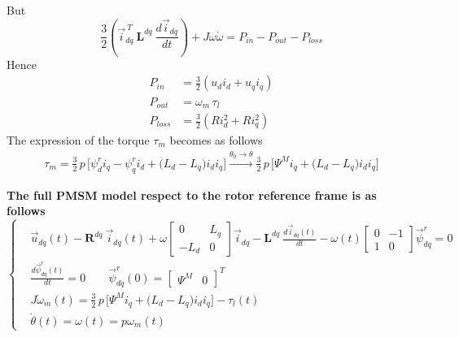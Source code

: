 \documentclass[11pt,a4paper,oneside]{book}
\numberwithin{equation}{section}
\theoremstyle{it}
\theoremstyle{definition}
\begin{document}
But 
\begin{equation*}
	\frac{3}{2} \left( \vec{i}_{dq}^{\ T}\ \mathbf{L}^{dq}\ 
	\frac{d\vec{i}_{dq}}{dt}\right) + J\omega\dot{\omega}= 
	P_{in}-P_{out}-P_{loss}
\end{equation*}
Hence
\begin{equation*}
	\begin{aligned}
		P_{in} &= \frac{3}{2}\left( u_d i_d+u_q i_q\right)  \\[6pt]
		P_{out} &= \omega_m\,\tau_l \\[6pt]
		P_{loss} &= \frac{3}{2}\left( Ri_d^2+Ri_q^2\right) 
	\end{aligned} 
\end{equation*}
The expression of the torque $\tau_m$ becomes as follows
\begin{equation}
	\begin{aligned}
		\tau_m = \frac{3}{2}\,p\,\Big[\psi^r_{d}i_{q}-\psi^r_{q}i_{d} + 
		\big(L_d-L_q\big)i_di_q\Big] 
		\xrightarrow{\theta_0\rightarrow\theta} 
		\frac{3}{2}\,p\,\Big[\Psi^Mi_{q}
		+ \big(L_d-L_q\big)i_di_q\Big]
	\end{aligned} 
\end{equation}

\begin{mybox}
	\textbf{The full PMSM model respect to the rotor reference frame is as 
		follows}
	\begin{equation}\label{twophase_model_ref_2}
		\left\lbrace \begin{aligned}
			& \vec{u}_{dq}(t)-\mathbf{R}^{dq}\ \vec{i}_{dq}(t)+ 
			\omega\begin{bmatrix} 0 & L_q\\ -L_d & 0 
			\end{bmatrix}\vec{i}_{dq} -\mathbf{L}^{dq}\ 
			\frac{d\vec{i}_{dq}(t)}{dt}-\omega(t) \begin{bmatrix} 0 & -1 \\ 
				1 & 0\end{bmatrix} \vec{\psi}^r_{dq} = 0 \\[6pt]
			& \frac{d\vec{\psi}^r_{dq}(t)}{dt} = 0 \qquad 
			\vec{\psi}^r_{dq}(0) = \begin{bmatrix} \Psi^M &  0 
			\end{bmatrix}^T \\[6pt]
			& J\dot{\omega}_m(t) = \frac{3}{2}\,p\,\Big[\Psi^Mi_{q} + 
			\big(L_d-L_q\big)i_di_q\Big] -\tau_l(t) \\[6pt]
			& \dot{\theta}(t) = \omega(t) = p\omega_m(t)
		\end{aligned} \right. 
	\end{equation}
\end{mybox}
\end{document}
